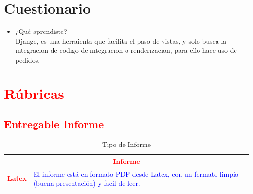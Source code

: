 \documentclass{article}
\begin{document}
\section{Cuestionario}
	\begin{itemize}
		\item ¿Qué aprendiste?
        \\Django, es una herraienta que facilita el paso de vistas, y solo busca la integracion de codigo de integracion o renderizacion, para ello hace uso de pedidos.
	\end{itemize}		

	\section{\textcolor{red}{Rúbricas}}
	
	\subsection{\textcolor{red}{Entregable Informe}}
	\begin{table}[H]
		\caption{Tipo de Informe}
		\setlength{\tabcolsep}{0.5em} %
		{\renewcommand{\arraystretch}{1.5}%
		\begin{tabular}{|p{3cm}|p{12cm}|}
			\hline
			\multicolumn{2}{|c|}{\textbf{\textcolor{red}{Informe}}}  \\
			\hline 
			\textbf{\textcolor{red}{Latex}} & \textcolor{blue}{El informe está en formato PDF desde Latex,  con un formato limpio (buena presentación) y facil de leer.}   \\ 
			\hline 
			
			
		\end{tabular}
	}
	\end{table}
	
	\clearpage
	
\end{document}
